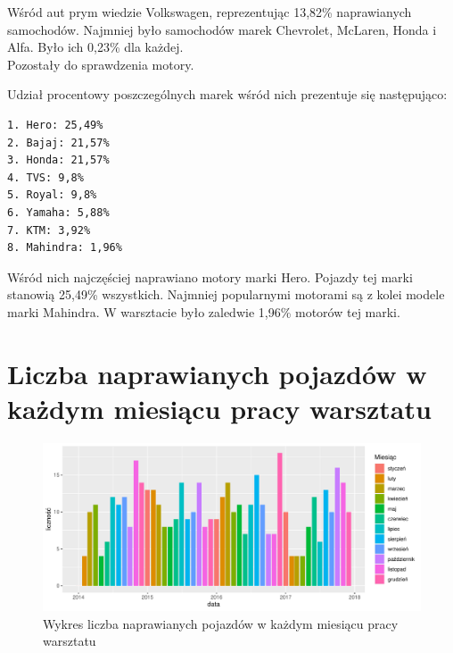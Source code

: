 \documentclass{article}\usepackage[]{graphicx}\usepackage[]{xcolor}
\makeatletter
\def\maxwidth{ %
  \ifdim\Gin@nat@width>\linewidth
    \linewidth
  \else
    \Gin@nat@width
  \fi
}
\newenvironment{knitrout}{}{} %
\makeatother
\begin{document}
Wśród aut prym wiedzie Volkswagen, reprezentując  13,82\% naprawianych samochodów. Najmniej było samochodów marek Chevrolet, McLaren, Honda i Alfa. Było ich 0,23\% dla każdej. \\

Pozostały do sprawdzenia motory.



Udział procentowy poszczególnych marek wśród nich prezentuje się następująco:

\begin{verbatim}
1. Hero: 25,49%
2. Bajaj: 21,57%
3. Honda: 21,57%
4. TVS: 9,8%
5. Royal: 9,8%
6. Yamaha: 5,88%
7. KTM: 3,92%
8. Mahindra: 1,96%
\end{verbatim}

Wśród nich najczęściej naprawiano motory marki Hero. Pojazdy tej marki stanowią 25,49\% wszystkich. Najmniej popularnymi motorami są z kolei modele marki Mahindra. W warsztacie było zaledwie 1,96\% motorów tej marki.

\section{Liczba naprawianych pojazdów w każdym miesiącu pracy warsztatu}

\begin{knitrout}
\color{fgcolor}\begin{figure}[H]

{\centering \includegraphics[width=\maxwidth]{figure/fig_naprawy_miesiecznie-1} 

}

\caption[Wykres liczba naprawianych pojazdów w każdym miesiącu pracy warsztatu]{Wykres liczba naprawianych pojazdów w każdym miesiącu pracy warsztatu}\label{fig:fig_naprawy_miesiecznie}
\end{figure}

\end{knitrout}
\end{document}
